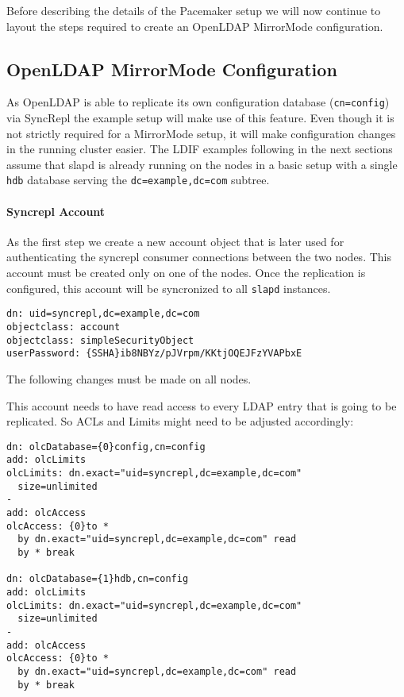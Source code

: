 \documentclass[a4paper,11pt,DIV=12]{scrartcl}
\begin{document}
    Before describing the details of the Pacemaker setup we will now continue
    to layout the steps required to create an OpenLDAP MirrorMode
    configuration.

\subsection{OpenLDAP MirrorMode Configuration}
    As OpenLDAP is able to replicate its own configuration
    database (\verb|cn=config|) via SyncRepl the example setup will make
    use of this feature. Even though it is not strictly required for a
    MirrorMode setup, it will make configuration changes in the running cluster
    easier. The LDIF examples following in the next sections assume that slapd
    is already running on the nodes in a basic setup with a single
    \verb|hdb| database serving the \verb|dc=example,dc=com| subtree.

\paragraph{Syncrepl Account}
    As the first step we create a new account object that is later used for
    authenticating the syncrepl consumer connections between the two nodes.
    This account must be created only on one of the nodes. Once the replication
    is configured, this account will be syncronized to all \verb|slapd| instances.
    \begin{verbatim}
dn: uid=syncrepl,dc=example,dc=com
objectclass: account
objectclass: simpleSecurityObject
userPassword: {SSHA}ib8NBYz/pJVrpm/KKtjOQEJFzYVAPbxE
    \end{verbatim}

    The following changes must be made on all nodes.

    This account needs to have read access to every LDAP entry that is going to
    be replicated. So ACLs and Limits might need to be adjusted accordingly:
    \begin{verbatim}
dn: olcDatabase={0}config,cn=config
add: olcLimits
olcLimits: dn.exact="uid=syncrepl,dc=example,dc=com"
  size=unlimited
-
add: olcAccess
olcAccess: {0}to *
  by dn.exact="uid=syncrepl,dc=example,dc=com" read
  by * break

dn: olcDatabase={1}hdb,cn=config
add: olcLimits
olcLimits: dn.exact="uid=syncrepl,dc=example,dc=com"
  size=unlimited
-
add: olcAccess
olcAccess: {0}to *
  by dn.exact="uid=syncrepl,dc=example,dc=com" read
  by * break
    \end{verbatim}
\end{document}
